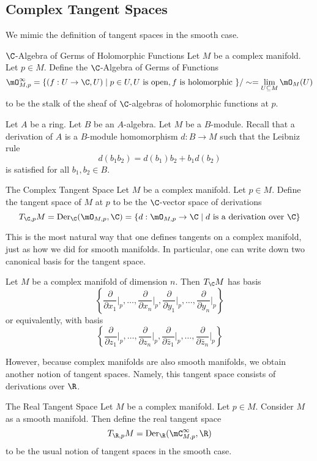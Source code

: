 \documentclass[a4paper]{article}
\begin{document}
\subsection{Complex Tangent Spaces}
We mimic the definition of tangent spaces in the smooth case. 

\begin{defn}{$\C$-Algebra of Germs of Holomorphic Functions}{} Let $M$ be a complex manifold. Let $p\in M$. Define the $\C$-Algebra of Germs of Functions $$\mO_{M,p}^\infty=\{(f:U\to\C, U)\;|\;p\in U, U\text{ is open}, f\text{ is holomorphic }\}/\sim=\lim_{U\subseteq M}\mO_M(U)$$ to be the stalk of the sheaf of $\C$-algebras of holomorphic functions at $p$. 
\end{defn}

Let $A$ be a ring. Let $B$ be an $A$-algebra. Let $M$ be a $B$-module. Recall that a derivation of $A$ is a $B$-module homomorphism $d:B\to M$ such that the Leibniz rule $$d(b_1b_2)=d(b_1)b_2+b_1d(b_2)$$ is satisfied for all $b_1,b_2\in B$. 

\begin{defn}{The Complex Tangent Space}{} Let $M$ be a complex manifold. Let $p\in M$. Define the tangent space of $M$ at $p$ to be the $\C$-vector space of derivations $$T_{\C,p}M=\text{Der}_\C(\mO_{M,p},\C)=\{d:\mO_{M,p}\to\C\;|\;d\text{ is a derivation over }\C\}$$
\end{defn}

This is the most natural way that one defines tangents on a complex manifold, just as how we did for smooth manifolds. In particular, one can write down two canonical basis for the tangent space. 

\begin{prp}{}{} Let $M$ be a complex manifold of dimension $n$. Then $T_{\C}M$ has basis $$\left\{\frac{\partial}{\partial x_1}\bigg\vert_p,\dots,\frac{\partial}{\partial x_n}\bigg\vert_p,\frac{\partial}{\partial y_1}\bigg\vert_p,\dots,\frac{\partial}{\partial y_n}\bigg\vert_p\right\}$$ or equivalently, with basis $$\left\{\frac{\partial}{\partial z_1}\bigg\vert_p,\dots,\frac{\partial}{\partial z_n}\bigg\vert_p,\frac{\partial}{\partial \bar{z}_1}\bigg\vert_p,\dots,\frac{\partial}{\partial \bar{z}_n}\bigg\vert_p\right\}$$
\end{prp}

However, because complex manifolds are also smooth manifolds, we obtain another notion of tangent spaces. Namely, this tangent space consists of derivations over $\R$. 

\begin{defn}{The Real Tangent Space}{} Let $M$ be a complex manifold. Let $p\in M$. Consider $M$ as a smooth manifold. Then define the real tangent space $$T_{\R,p}M=\text{Der}_\R(\mC_{M,p}^\infty,\R)$$ to be the usual notion of tangent spaces in the smooth case. 
\end{defn}
\end{document}
